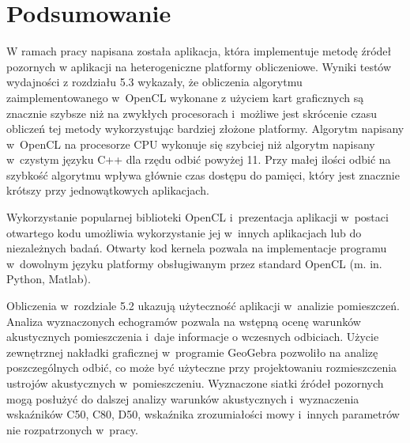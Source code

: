 \chapter{Podsumowanie}\label{cha:podsum}

W ramach pracy napisana została aplikacja, która implementuje metodę źródeł pozornych w aplikacji na heterogeniczne platformy obliczeniowe. Wyniki testów wydajności z rozdziału 5.3 wykazały, że obliczenia algorytmu zaimplementowanego w~OpenCL wykonane z użyciem kart graficznych są znacznie szybsze niż na zwykłych procesorach i~możliwe jest skrócenie czasu obliczeń tej metody wykorzystując bardziej złożone platformy. Algorytm napisany w~OpenCL na procesorze CPU wykonuje się szybciej niż algorytm napisany w~czystym języku C++ dla rzędu odbić powyżej 11. Przy małej ilości odbić na szybkość algorytmu wpływa głównie czas dostępu do pamięci, który jest znacznie krótszy przy jednowątkowych aplikacjach.    

Wykorzystanie popularnej biblioteki OpenCL i~prezentacja aplikacji w~postaci otwartego kodu umożliwia wykorzystanie jej w~innych aplikacjach  lub do niezależnych badań. Otwarty kod kernela pozwala na implementacje programu w~dowolnym języku platformy obsługiwanym przez standard OpenCL (m. in. Python, Matlab).

Obliczenia w~rozdziale 5.2 ukazują użyteczność aplikacji w~analizie pomieszczeń. Analiza wyznaczonych echogramów pozwala na wstępną ocenę warunków akustycznych pomieszczenia i~daje informacje o wczesnych odbiciach. Użycie zewnętrznej nakładki graficznej w~programie GeoGebra pozwoliło na analizę poszczególnych odbić, co może być użyteczne przy projektowaniu rozmieszczenia ustrojów akustycznych w~pomieszczeniu. Wyznaczone siatki źródeł pozornych mogą posłużyć do dalszej analizy warunków akustycznych i~wyznaczenia wskaźników C50, C80, D50, wskaźnika zrozumiałości mowy i~innych parametrów nie rozpatrzonych w~pracy.